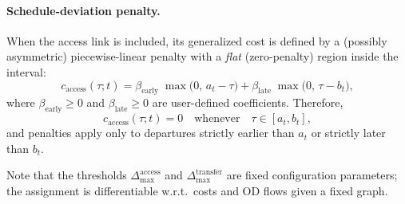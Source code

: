 \paragraph{Schedule-deviation penalty.}
When the access link is included, its generalized cost is defined by a (possibly asymmetric)
piecewise-linear penalty with a \emph{flat} (zero-penalty) region inside the interval:
\[
c_{\mathrm{access}}(\tau;t)
=
\beta_{\mathrm{early}}\;\max\!\bigl(0,\,a_t-\tau\bigr)
+
\beta_{\mathrm{late}}\;\max\!\bigl(0,\,\tau-b_t\bigr),
\]
where $\beta_{\mathrm{early}}\ge 0$ and $\beta_{\mathrm{late}}\ge 0$ are user-defined coefficients.
Therefore,
\[
c_{\mathrm{access}}(\tau;t)=0
\quad\text{whenever}\quad \tau\in[a_t,b_t],
\]
and penalties apply only to departures strictly earlier than $a_t$ or strictly later than $b_t$.

Note that the thresholds $\Delta_{\max}^{\mathrm{access}}$ and $\Delta_{\max}^{\mathrm{transfer}}$
are fixed configuration parameters; the assignment is differentiable w.r.t.\ costs and OD flows
given a fixed graph.

